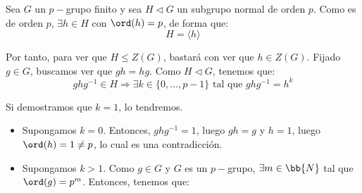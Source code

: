 \begin{ejercicio}
\begin{enumerate}
        Sea $G$ un $p-$grupo finito y sea $H\lhd G$ un subgrupo normal de orden $p$. Como es de orden $p$, $\exists h\in H$ con $\ord(h)=p$, de forma que:
        \begin{equation*}
            H = \langle h \rangle
        \end{equation*}

        Por tanto, para ver que $H\leq Z(G)$, bastará con ver que $h\in Z(G)$. Fijado $g\in G$, buscamos ver que $gh=hg$. Como $H\lhd G$, tenemos que:
        \begin{equation*}
            ghg^{-1} \in H
            \Longrightarrow
            \exists k\in \{0,\ldots,p-1\}\text{ tal que }ghg^{-1} = h^k
        \end{equation*}

        Si demostramos que $k=1$, lo tendremos.
        \begin{itemize}
            \item Supongamos $k=0$. Entonces, $ghg^{-1}=1$, luego $gh=g$ y $h=1$, luego $\ord(h)=1\neq p$, lo cual es una contradicción.
            \item Supongamos $k>1$. Como $g\in G$ y $G$ es un $p-$grupo, $\exists m\in \bb{N}$ tal que $\ord(g)=p^m$. Entonces, tenemos que:
        \end{itemize}

    \end{enumerate}
\end{ejercicio}

